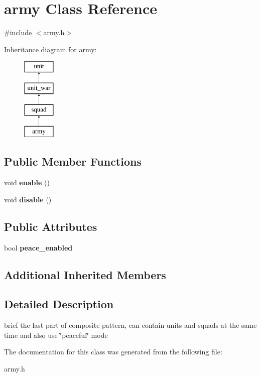 \hypertarget{classarmy}{}\section{army Class Reference}
\label{classarmy}


{\ttfamily \#include $<$army.\+h$>$}

Inheritance diagram for army\+:\begin{figure}[H]
\begin{center}
\leavevmode
\includegraphics[height=4.000000cm]{classarmy}
\end{center}
\end{figure}
\subsection*{Public Member Functions}
\begin{DoxyCompactItemize}
\item 
\mbox{\label{classarmy_a97a8890e39d247b95c14740c8d930e14}} 
void {\bfseries enable} ()
\item 
\mbox{\label{classarmy_a10e871fc70e584a000bee5abe4f8b6e6}} 
void {\bfseries disable} ()
\end{DoxyCompactItemize}
\subsection*{Public Attributes}
\begin{DoxyCompactItemize}
\item 
\mbox{\label{classarmy_a58d160ef4574dd273d1e08b62e786a00}} 
bool {\bfseries peace\+\_\+enabled}
\end{DoxyCompactItemize}
\subsection*{Additional Inherited Members}


\subsection{Detailed Description}
brief the last part of composite pattern, can contain units and squads at the same time and also use \char`\"{}peaceful\char`\"{} mode 

The documentation for this class was generated from the following file\+:\begin{DoxyCompactItemize}
\item 
army.\+h\end{DoxyCompactItemize}
